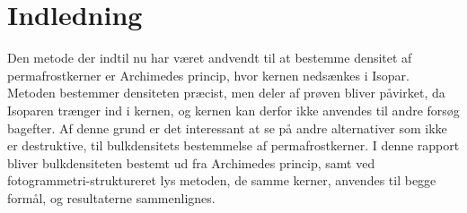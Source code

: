 \chapter{Indledning}
Den metode der indtil nu har været andvendt til at bestemme densitet af permafrostkerner er Archimedes princip, hvor kernen nedsænkes i Isopar. Metoden bestemmer densiteten præcist, men deler af prøven bliver påvirket, da Isoparen trænger ind i kernen, og kernen kan derfor ikke anvendes til andre forsøg bagefter. Af denne grund er det interessant at se på andre alternativer som ikke er destruktive, til bulkdensitets bestemmelse af permafrostkerner. I denne rapport bliver bulkdensiteten bestemt ud fra Archimedes princip, samt ved fotogrammetri-struktureret lys metoden, de samme kerner, anvendes til begge formål, og resultaterne sammenlignes.    